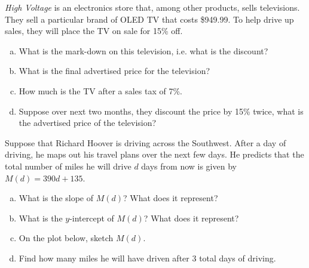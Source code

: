 \documentclass[11pt,letterpaper]{article}
\begin{document}

 \textit{High Voltage} is an electronics store that, among other products, sells televisions. They sell a particular brand of OLED TV that costs \$949.99. To help drive up sales, they will place the TV on sale for 15\% off. 
	\begin{enumerate}[(a)]
	\item What is the mark-down on this television, i.e. what is the discount?
	\item What is the final advertised price for the television?
	\item How much is the TV after a sales tax of 7\%. 
	\item Suppose over next two months, they discount the price by 15\% twice, what is the advertised price of the television? 
	\end{enumerate}



\newpage



 Suppose that Richard Hoover is driving across the Southwest. After a day of driving, he maps out his travel plans over the next few days. He predicts that the total number of miles he will drive $d$ days from now is given by $M(d)= 390d + 135$. 
	\begin{enumerate}[(a)]
	\item What is the slope of $M(d)$? What does it represent?
	\item What is the $y$-intercept of $M(d)$? What does it represent?
	\item On the plot below, sketch $M(d)$. 
	\item Find how many miles he will have driven after 3 total days of driving.
	\end{enumerate}
\end{document}
